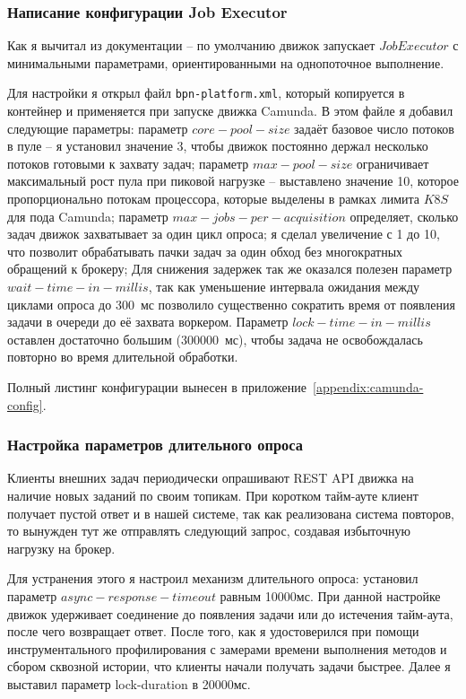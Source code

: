\subsubsection{Написание конфигурации Job Executor}

Как я вычитал из документации -- по умолчанию движок запускает $Job Executor$ с минимальными параметрами, ориентированными на однопоточное выполнение.

Для настройки я открыл файл \texttt{bpn-platform.xml}, который копируется в контейнер и применяется при запуске движка Camunda. В этом файле я добавил следующие параметры:
параметр $core-pool-size$ задаёт базовое число потоков в пуле -- я установил значение 3, чтобы движок постоянно держал несколько потоков готовыми к захвату задач;
параметр $max-pool-size$ ограничивает максимальный рост пула при пиковой нагрузке -- выставлено значение 10, которое пропорционально потокам процессора, которые выделены в рамках лимита $K8S$ для пода Camunda;
параметр $max-jobs-per-acquisition$ определяет, сколько задач движок захватывает за один цикл опроса; я сделал увеличение с 1 до 10, что позволит обрабатывать пачки задач за один обход без многократных обращений к брокеру;
Для снижения задержек так же оказался полезен параметр $wait-time-in-millis$, так как уменьшение интервала ожидания между циклами опроса до 300~мс позволило существенно сократить время от появления задачи в очереди до её захвата воркером.
Параметр $lock-time-in-millis$ оставлен достаточно большим (300000~мс), чтобы задача не освобождалась повторно во время длительной обработки.

Полный листинг конфигурации вынесен в приложение~\ref{appendix:camunda-config}.

\subsubsection{Настройка параметров длительного опроса}

Клиенты внешних задач периодически опрашивают REST API движка на наличие новых заданий по своим топикам.
При коротком тайм-ауте клиент получает пустой ответ и в нашей системе, так как реализована система повторов, то вынужден тут же отправлять следующий запрос, создавая избыточную нагрузку на брокер.

Для устранения этого я настроил механизм длительного опроса: установил параметр $async-response-timeout$ равным 10000мс.
При данной настройке движок удерживает соединение до появления задачи или до истечения тайм-аута, после чего возвращает ответ. После того, как я удостоверился при помощи инструментального профилирования с замерами времени выполнения методов и сбором сквозной истории, что клиенты начали получать задачи быстрее.
Далее я выставил параметр lock-duration в 20000мс.

